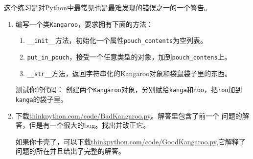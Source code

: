\begin{ex}


这个练习是对Python中最常见也是最难发现的错误之一的一个警告。

\begin{enumerate}


\item 编写一个类{\tt Kangaroo}，要求拥有下面的方法：

\begin{enumerate}

\item \verb"__init__"方法，初始化一个属性\verb"pouch_contents"为空列表。

\item \verb"put_in_pouch"，接受一个任意类型的对象，加到\verb"pouch_contens"上。

\item \verb"__str__"方法，返回字符串化的Kangaroo对象和袋鼠袋子里的东西。

\end{enumerate}

测试你的代码：
创建两个{\tt Kangaroo}对象，分别赋给{\tt kanga}和{\tt roo}，把{\tt roo}加到{\tt kanga}的袋子里。

\item 下载\url{thinkpython.com/code/BadKangaroo.py}。解答里包含了前一个
问题的解答，但是有一个很大的bug。找出并改正它。

如果你卡壳了，可以下载\url{thinkpython.com/code/GoodKangaroo.py},它解释了问题的所在并且给出了完整的解答。

\end{enumerate}
\end{ex}


